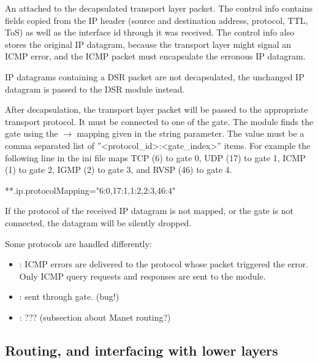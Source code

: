 An  attached to the decapsulated transport layer packet.
The control info contains fields copied from the IP header (source and destination
address, protocol, TTL, ToS) as well as the interface id through it was received.
The control info also stores the original IP datagram, because the transport
layer might signal an ICMP error, and the ICMP packet must encapsulate the
erronous IP datagram.
\begin{note}
IP datagrams containing a DSR packet are not decapsulated, the unchanged IP
datagram is passed to the DSR module instead.
\end{note}

After decapsulation, the transport layer packet will be passed to the appropriate
transport protocol. It must be connected to one of the  gate.
The  module finds the gate using the $\rightarrow$
 mapping given in the  string parameter.
The value must be a comma separated list of ''<protocol\_id>:<gate\_index>'' items.
For example the following line in the ini file maps TCP (6) to gate 0, UDP (17)
to gate 1, ICMP (1) to gate 2, IGMP (2) to gate 3, and RVSP (46) to gate 4.
\begin{inifile}
**.ip.protocolMapping="6:0,17:1,1:2,2:3,46:4"
\end{inifile}
If the protocol of the received IP datagram is not mapped, or the gate
is not connected, the datagram will be silently dropped.

Some protocols are handled differently:
\begin{itemize}
  \item {}: ICMP errors are delivered to the protocol
        whose packet triggered the error. Only ICMP query
        requests and responses are sent to the  module.
  \item {}: sent through  gate. (bug!)
  \item {}: ??? (subsection about Manet routing?)
\end{itemize}



\subsection{Routing, and interfacing with lower layers}
\label{subsec:ip_routing}

